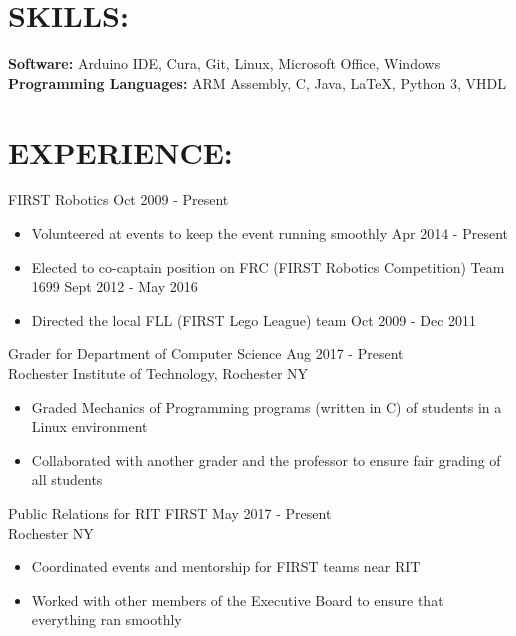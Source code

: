 \documentclass[line,margin]{res}
\begin{document}
\begin{resume}
\section{SKILLS:}

	\textbf{Software:} Arduino IDE, Cura, Git, Linux, Microsoft Office, Windows \\
	\textbf{Programming Languages:} ARM Assembly, C, Java, \LaTeX, Python 3, VHDL 

\section{EXPERIENCE:}

	FIRST Robotics \hfill Oct 2009 - Present
	\begin{itemize}
		\item Volunteered at events to keep the event running smoothly \hfill Apr 2014 - Present
		\item Elected to co-captain position on FRC (FIRST Robotics Competition) Team 1699 \hfill Sept 2012 - May 2016
		\item Directed the local FLL (FIRST Lego League) team \hfill Oct 2009 - Dec 2011
	\end{itemize}
	\vspace{-8pt}

	Grader for Department of Computer Science \hfill Aug 2017 - Present\\
	Rochester Institute of Technology, Rochester NY
	\begin{itemize}
		\item Graded Mechanics of Programming programs (written in C) of students in a Linux environment
		\item Collaborated with another grader and the professor to ensure fair grading of all students
	\end{itemize}
	\vspace{-8pt}	

	Public Relations for RIT FIRST \hfill May 2017 - Present\\
	Rochester NY
	\begin{itemize}
		\item Coordinated events and mentorship for FIRST teams near RIT
		\item Worked with other members of the Executive Board to ensure that everything ran smoothly
	\end{itemize}


\end{resume}
\end{document}
